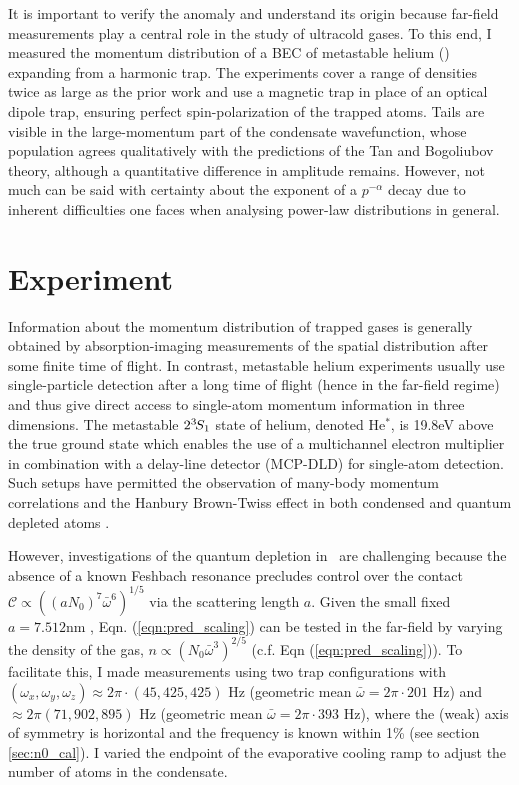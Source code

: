 	It is important to verify the anomaly and understand its origin because far-field measurements play a central role in the study of ultracold gases.
	To this end, I measured the momentum distribution of a BEC of metastable helium (\mhe) expanding from a harmonic trap. 
	The experiments cover a range of densities twice as large as the prior work and use a magnetic trap in place of an optical dipole trap, ensuring perfect spin-polarization of the trapped atoms. 
	Tails are visible in the large-momentum part of the condensate wavefunction, whose population agrees qualitatively with the predictions of the Tan and Bogoliubov theory, although a quantitative difference in amplitude remains.
	However, not much can be said with certainty about the exponent of a $p^{-\alpha}$ decay due to inherent difficulties one faces when analysing power-law distributions in general. 
	
		
	

\section{Experiment} 
	Information about the momentum distribution of trapped gases is generally obtained by absorption-imaging measurements of the spatial distribution after some finite time of flight. In contrast, metastable helium experiments usually use single-particle detection after a long time of flight (hence in the far-field regime) and thus give direct access to  single-atom momentum information in three dimensions. The metastable $2^{3\!}S_1$ state of helium, denoted He$^*$, is 19.8eV above the true ground state \cite{Hodgman09_mhe} which enables the use of a multichannel electron multiplier in combination with a delay-line detector (MCP-DLD) \cite{Manning10} for single-atom detection. Such setups have permitted the observation of many-body momentum correlations \cite{Hodgman11,Dall13} and the Hanbury Brown-Twiss effect in both condensed \cite{Schellekens05,Jeltes07,Manning10,Dall11,Perrin07,Perrin12} and quantum depleted atoms \cite{Cayla20}. 
	
	However, investigations of the quantum depletion in \mhe~are challenging because the absence of a known Feshbach resonance precludes control over the contact $\mathcal{C}\propto((a N_0)^7\bar{\omega}^6)^{1/5}$ via the scattering length $a$. 
	Given the small fixed $a=7.512$nm \cite{Moal06}, Eqn. (\ref{eqn:pred_scaling}) can be tested in the far-field by varying the density of the gas, $n\propto\left(N_{0}\bar{\omega}^3\right)^{2/5}$ (c.f. Eqn (\ref{eqn:pred_scaling})). 
	To facilitate this, I made measurements using two trap configurations with $(\omega_x,\omega_y,\omega_z)\approx 2\pi\cdot(45,425,425)$ Hz (geometric mean $\bar{\omega} = 2\pi \cdot201$ Hz) and 
	$\approx2\pi (71,902,895)$ Hz (geometric mean $\bar{\omega} = 2\pi \cdot393$ Hz), where the (weak) axis of symmetry is horizontal and the frequency is known within 1\% (see section \ref{sec:n0_cal}).
	I varied the endpoint of the evaporative cooling ramp to adjust the number of atoms in the condensate. 
	
